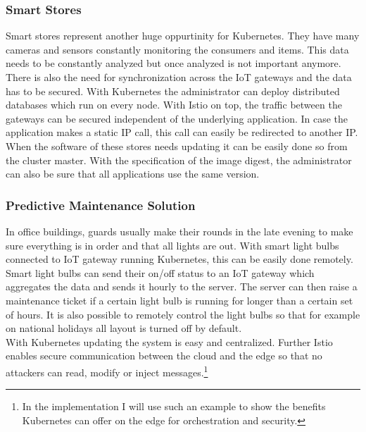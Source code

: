 \subsubsection{Smart Stores}
Smart stores represent another huge oppurtinity for Kubernetes. They have many cameras and sensors constantly monitoring the consumers and items. This data needs to be constantly analyzed but once analyzed is not important anymore. There is also the need for synchronization across the IoT gateways and the data has to be secured. With Kubernetes the administrator can deploy distributed databases which run on every node. With Istio on top, the traffic between the gateways can be secured independent of the underlying application. In case the application makes a static IP call, this call can easily be redirected to another IP.\\
When the software of these stores needs updating it can be easily done so from the cluster master. With the specification of the image digest, the administrator can also be sure that all applications use the same version.

\subsubsection{Predictive Maintenance Solution}
In office buildings, guards usually make their rounds in the late evening to make sure everything is in order and that all lights are out. With smart light bulbs connected to IoT gateway running Kubernetes, this can be easily done remotely. Smart light bulbs can send their on/off status to an IoT gateway which aggregates the data and sends it hourly to the server. The server can then raise a maintenance ticket if a certain light bulb is running for longer than a certain set of hours. It is also possible to remotely control the light bulbs so that for example on national holidays all layout is turned off by default.\\
With Kubernetes updating the system is easy and centralized. Further Istio enables secure communication between the cloud and the edge so that no attackers can read, modify or inject messages.\footnote{In the implementation I will use such an example to show the benefits Kubernetes can offer on the edge for orchestration and security.}

